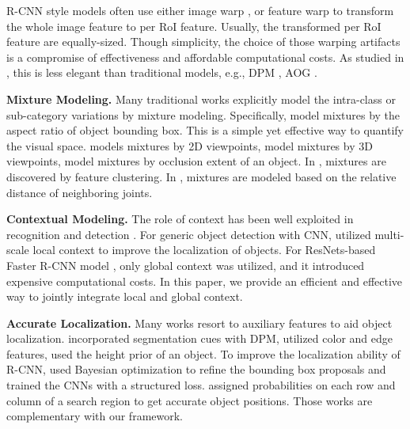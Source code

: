 \documentclass[10pt,twocolumn,letterpaper]{article}
\begin{document}
R-CNN style models often use either image warp \cite{rcnn,yuting,yukun}, or feature warp \cite{sppnet, fast_rcnn,faster_rcnn} to transform the whole image feature to per RoI feature. Usually, the transformed per RoI feature are equally-sized. Though simplicity, the choice of those warping artifacts is a compromise of effectiveness and affordable computational costs. As studied in \cite{wanli}, this is less elegant than traditional models, e.g., DPM \cite{DPM,pff_grammar,mixture_dpm,ssdpm}, AOG \cite{zhu_grammar,carAOG}.

\textbf{Mixture Modeling.}
Many traditional works \cite{DPM,pff_grammar,mixture_dpm,ssdpm,ramananPose,subcat,3dvp,Lopez2011,bojan_cvpr13,carAOG} explicitly model the intra-class or sub-category variations by mixture modeling. 
Specifically, \cite{DPM,pff_grammar} model mixtures by the aspect ratio of object bounding box. This is a simple yet effective way to quantify the visual space. \cite{Lopez2011} models mixtures by 2D viewpoints, \cite{bojan_cvpr12,mono3d} model mixtures by 3D viewpoints, \cite{bojan_cvpr13,xiaogang1,carAOG} model mixtures by occlusion extent of an object. In \cite{mixture_dpm,subcat,3dvp}, mixtures are discovered by feature clustering. In \cite{ramananPose,xianjie}, mixtures are modeled based on the relative distance of neighboring joints.


\textbf{Contextual Modeling.}
The role of context has been well exploited in recognition and detection \cite{desai, carAOG, guangchen_cvpr, hoiem06, torralba, haoxiang, laptev15}. For generic object detection with CNN,
\cite{mrcnn, multipath} utilized multi-scale local context to improve the localization of objects.
For ResNets-based Faster R-CNN model \cite{resNet}, only global context was utilized, and it introduced expensive computational costs. In this paper, we provide an efficient and effective way to jointly integrate local and global context.

\textbf{Accurate Localization.}
Many works resort to auxiliary features to aid object localization. \cite{fidler} incorporated segmentation cues with DPM, \cite{hoiem_loc} utilized color and edge features, \cite{Schulter_2014_CVPR} used the height prior of an object. To improve the localization ability of R-CNN,
\cite{yuting} used Bayesian optimization to refine the bounding box proposals and trained the CNNs with a structured loss. \cite{locNet} assigned probabilities on each row and column of a search region to get accurate object positions. Those works are complementary with our framework.
\end{document}
